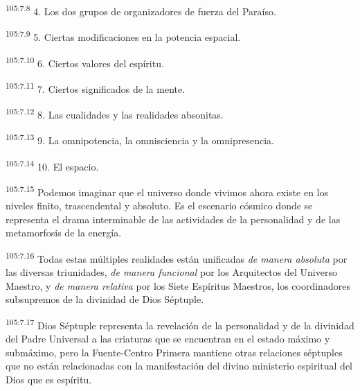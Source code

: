 \par
\textsuperscript{105:7.8} 4. Los dos grupos de organizadores de fuerza del Paraíso.

\par
\textsuperscript{105:7.9} 5. Ciertas modificaciones en la potencia espacial.

\par
\textsuperscript{105:7.10} 6. Ciertos valores del espíritu.

\par
\textsuperscript{105:7.11} 7. Ciertos significados de la mente.

\par
\textsuperscript{105:7.12} 8. Las cualidades y las realidades absonitas.

\par
\textsuperscript{105:7.13} 9. La omnipotencia, la omnisciencia y la omnipresencia.

\par
\textsuperscript{105:7.14} 10. El espacio.

\par
\textsuperscript{105:7.15} Podemos imaginar que el universo donde vivimos ahora existe en los niveles finito, trascendental y absoluto. Es el escenario cósmico donde se representa el drama interminable de las actividades de la personalidad y de las metamorfosis de la energía.

\par
\textsuperscript{105:7.16} Todas estas múltiples realidades están unificadas \textit{de manera absoluta} por las diversas triunidades, \textit{de manera funcional} por los Arquitectos del Universo Maestro, y \textit{de manera relativa} por los Siete Espíritus Maestros, los coordinadores subsupremos de la divinidad de Dios Séptuple.

\par
\textsuperscript{105:7.17} Dios Séptuple representa la revelación de la personalidad y de la divinidad del Padre Universal a las criaturas que se encuentran en el estado máximo y submáximo, pero la Fuente-Centro Primera mantiene otras relaciones séptuples que no están relacionadas con la manifestación del divino ministerio espiritual del Dios que es espíritu.

